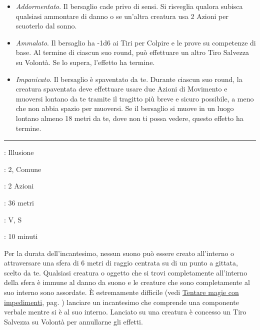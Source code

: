 \begin{multicols}{2}
\begin{itemize}[leftmargin=*] \setlength{\itemsep}{0pt}
	\item \emph{Addormentato}. Il bersaglio cade privo di sensi. Si risveglia qualora subisca qualsiasi ammontare di danno o se un'altra creatura usa 2 Azioni per scuoterlo dal sonno.
	\item \emph{Ammalato}. Il bersaglio ha -1d6 ai Tiri per Colpire e le prove su competenze di base. Al termine di ciascun suo round, può effettuare un altro Tiro Salvezza su Volontà. Se lo supera, l'effetto ha termine.
	\item \emph{Impanicato}. Il bersaglio è spaventato da te. Durante ciascun suo round, la creatura spaventata deve effettuare usare due Azioni di Movimento e muoversi lontano da te tramite il tragitto più breve e sicuro possibile, a meno che non abbia spazio per muoversi. Se il bersaglio si muove in un luogo lontano almeno 18 metri da te, dove non ti possa vedere, questo effetto ha termine.
\end{itemize}

\smallskip\noindent\rule{\linewidth}{2pt} \hypertarget{Silenzio}{}\medskip{}
\noindent
\begin{description}[noitemsep, topsep=0pt, parsep=0pt, partopsep=0pt, leftmargin=0cm, labelwidth=2.8cm]
	\item[\textbf{Lista di Magia}]: Illusione
	\item[\textbf{Livello}]: 2, Comune
	\item[\textbf{T. di Lancio}]: 2 Azioni
	\item[\textbf{Gittata}]: 36 metri
	\item[\textbf{Componenti}]: V, S
	\item[\textbf{Durata}]: 10 minuti
\end{description}

Per la durata dell'incantesimo, nessun suono può essere creato all'interno o attraversare una sfera di 6 metri di raggio centrata su di un punto a gittata, scelto da te. Qualsiasi creatura o oggetto che si trovi completamente all'interno della sfera è immune al danno da suono e le creature che sono completamente al suo interno sono assordate. È estremamente difficile (vedi \hyperlink{magieconimpedimenti}{Tentare magie con impedimenti}, pag. \pageref{magieconimpedimenti} ) lanciare un incantesimo che comprende una componente verbale mentre si è al suo interno. Lanciato su una creatura è concesso un Tiro Salvezza su Volontà per annullarne gli effetti.


\end{multicols}

